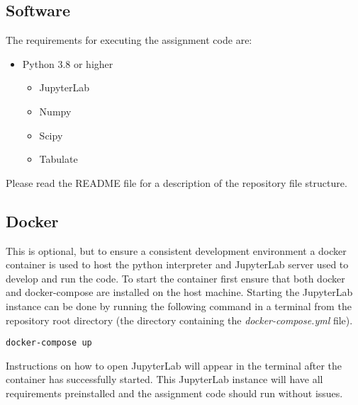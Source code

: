     \newpage

    \begin{appendices}
        \section{Software}
        The requirements for executing the assignment code are:
        \begin{itemize}
            \item Python 3.8 or higher
                \begin{itemize}
                    \item JupyterLab
                    \item Numpy
                    \item Scipy
                    \item Tabulate
                \end{itemize}            
        \end{itemize}

        Please read the README file for a description of the repository file structure.
        
        \subsection{Docker}
        This is optional, but to ensure a consistent development environment a docker container is used to host the python interpreter and JupyterLab server used to develop and run the code. To start the container first ensure that both docker and docker-compose are installed on the host machine. Starting the JupyterLab instance can be done by running the following command in a terminal from the repository root directory (the directory containing the \emph{docker-compose.yml} file).

        \texttt{docker-compose up}

        Instructions on how to open JupyterLab will appear in the terminal after the container has successfully started. This JupyterLab instance will have all requirements preinstalled and the assignment code should run without issues.        

    \end{appendices}


    \printbibliography

